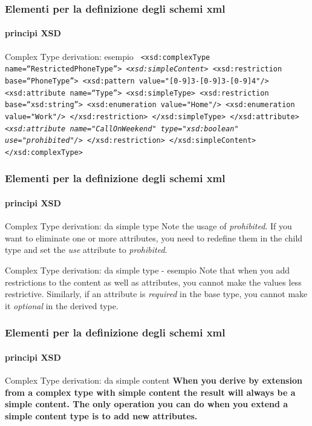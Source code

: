 
\begin{frame}
	\frametitle{Elementi per la definizione degli schemi xml}
	\framesubtitle{principi XSD}
	\addtocounter{nframe}{1}

	\begin{block}{Complex Type derivation: esempio}
		\texttt{
			<xsd:complexType name=``RestrictedPhoneType''>
  				\emph{<xsd:simpleContent>}
    				<xsd:restriction base=``PhoneType''>
      				<xsd:pattern value="[0-9]{3}-[0-9]{3}-[0-9]{4}"/>
      				<xsd:attribute name=``Type''>
        				<xsd:simpleType>
          					<xsd:restriction base=``xsd:string''>
          					<xsd:enumeration value="Home"/>
            				<xsd:enumeration value="Work"/>
         					</xsd:restriction>
        				</xsd:simpleType>
      				</xsd:attribute>
      				\textit{<xsd:attribute name="CallOnWeekend" type="xsd:boolean" use="prohibited"/> }
    				</xsd:restriction>
  				</xsd:simpleContent>
			</xsd:complexType>
		}
	\end{block}
\end{frame}


\begin{frame}
	\frametitle{Elementi per la definizione degli schemi xml}
	\framesubtitle{principi XSD}
	\addtocounter{nframe}{1}

	\begin{block}{Complex Type derivation: da simple type}
		Note the usage of \textit{prohibited}. If you want to eliminate one or more attributes, you need to redefine them in the child type and set the \textit{use} attribute to \textit{prohibited}.
	\end{block}

	\begin{block}{Complex Type derivation: da simple type - esempio}
		Note that when you add restrictions to the content as well as attributes, you cannot make the values less restrictive. Similarly, if an attribute is \textit{required} in the base type, you cannot make it \textit{optional} in the derived type.
	\end{block}
\end{frame}

\begin{frame}
	\frametitle{Elementi per la definizione degli schemi xml}
	\framesubtitle{principi XSD}
	\addtocounter{nframe}{1}

	\begin{block}{Complex Type derivation: da simple content}
		\textbf{When you derive by extension from a complex type with simple content the result will always be a simple content. The only operation you can do when you extend a simple content type is to add new attributes.}
	\end{block}

\end{frame}




